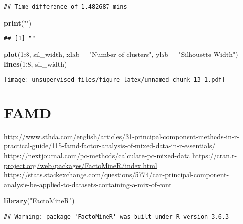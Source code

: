 \documentclass[
]{article}
\newenvironment{Shaded}{\begin{snugshade}}{\end{snugshade}}
\newcommand{\DataTypeTok}[1]{\textcolor[rgb]{0.13,0.29,0.53}{#1}}
\newcommand{\DecValTok}[1]{\textcolor[rgb]{0.00,0.00,0.81}{#1}}
\newcommand{\KeywordTok}[1]{\textcolor[rgb]{0.13,0.29,0.53}{\textbf{#1}}}
\newcommand{\NormalTok}[1]{#1}
\newcommand{\OperatorTok}[1]{\textcolor[rgb]{0.81,0.36,0.00}{\textbf{#1}}}
\newcommand{\StringTok}[1]{\textcolor[rgb]{0.31,0.60,0.02}{#1}}
\begin{document}
\begin{verbatim}
## Time difference of 1.482687 mins
\end{verbatim}

\begin{Shaded}
\begin{Highlighting}[]
\KeywordTok{print}\NormalTok{(}\StringTok{""}\NormalTok{)}
\end{Highlighting}
\end{Shaded}

\begin{verbatim}
## [1] ""
\end{verbatim}

\begin{Shaded}
\begin{Highlighting}[]
\KeywordTok{plot}\NormalTok{(}\DecValTok{1}\OperatorTok{:}\DecValTok{8}\NormalTok{, sil_width,}
      \DataTypeTok{xlab =} \StringTok{"Number of clusters"}\NormalTok{,}
      \DataTypeTok{ylab =} \StringTok{"Silhouette Width"}\NormalTok{)}
\KeywordTok{lines}\NormalTok{(}\DecValTok{1}\OperatorTok{:}\DecValTok{8}\NormalTok{, sil_width)}
\end{Highlighting}
\end{Shaded}

\texttt{[image: unsupervised\_files/figure-latex/unnamed-chunk-13-1.pdf]}

\hypertarget{famd}{%
\section{FAMD}\label{famd}}

\url{http://www.sthda.com/english/articles/31-principal-component-methods-in-r-practical-guide/115-famd-factor-analysis-of-mixed-data-in-r-essentials/}
\url{https://nextjournal.com/pc-methods/calculate-pc-mixed-data}
\url{https://cran.r-project.org/web/packages/FactoMineR/index.html}
\url{https://stats.stackexchange.com/questions/5774/can-principal-component-analysis-be-applied-to-datasets-containing-a-mix-of-cont}

\begin{Shaded}
\begin{Highlighting}[]
\KeywordTok{library}\NormalTok{(}\StringTok{"FactoMineR"}\NormalTok{)}
\end{Highlighting}
\end{Shaded}

\begin{verbatim}
## Warning: package 'FactoMineR' was built under R version 3.6.3
\end{verbatim}
\end{document}
